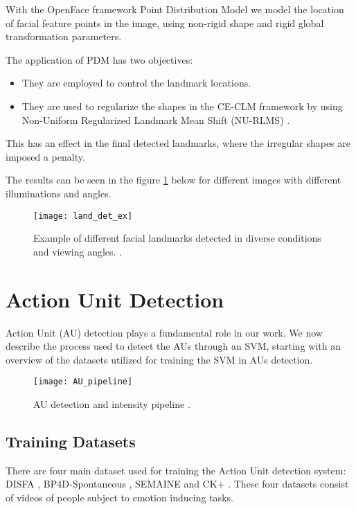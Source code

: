 With the OpenFace framework Point Distribution Model \cite{PDM_RLMS} we model the location of facial feature points in the image, using non-rigid shape and rigid global transformation parameters.

The application of PDM has two objectives:

\begin{itemize}
	\item They are employed to control the landmark locations.
	\item They are used to regularize the shapes in the CE-CLM framework by using Non-Uniform Regularized Landmark Mean Shift (NU-RLMS) \cite{Baltru2013}.
\end{itemize}
This has an effect in the final detected landmarks, where the irregular shapes are imposed a penalty.

The results can be seen in the figure \ref{fig:land_det_ex} below for different images with different illuminations and angles. 

\begin{figure}[H]
	\centering
	\texttt{[image: land\_det\_ex]}
	\caption{Example of different facial landmarks detected in diverse conditions and viewing angles. \cite{Baltru2018}.}
	\label{fig:land_det_ex}
\end{figure}

\clearpage

\section{Action Unit Detection} \label{au_det}
Action Unit (AU) detection plays a fundamental role in our work. We now describe the process used to detect the AUs through an SVM, starting with an overview of the datasets utilized for training the SVM in AUs detection.

\begin{figure}[H]
	\centering
	\texttt{[image: AU\_pipeline]}
	\caption{AU detection and intensity pipeline \cite{Baltru2015}.}
	\label{fig:AU_pipeline}
\end{figure}

\subsection{Training Datasets}
There are four main dataset used for training the Action Unit detection system: DISFA \cite{DISFA}, BP4D-Spontaneous \cite{BP4D-Spontaneous}, SEMAINE \cite{SEMAINE} and CK+ \cite{CK+}. These four datasets consist of videos of people subject to emotion inducing tasks.

